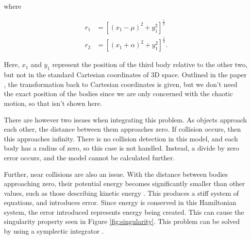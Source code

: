 \documentclass{article}
\begin{document}
where 

\begin{align}
    r_1 &= \left[(x_1 - \mu)^2 + y_1^2\right]^{\frac{1}{2}} \nonumber \\
    r_2 &= \left[(x_1 + \alpha)^2 + y_1^2\right]^{\frac{1}{2}}.
\end{align}

Here, $x_1$ and $y_1$ represent the position of the third body relative to the other two,
but not in the standard 
Cartesian coordinates of 3D space. Outlined in the paper \cite{eberle2007case}, the 
transformation back to Cartesian coordinates is given, but we don't need the exact 
position of the bodies since we are only concerned with the chaotic motion, so that isn't 
shown here.

There are however two issues when integrating this problem. As objects approach each
other, the distance between them 
approaches zero. If collision occurs, then this approaches infinity. There is no 
collision detection in this model, and each body has a radius of zero,
so this case is not handled. Instead, a divide by zero error occurs,
and the model cannot be calculated further.

Further, near collisions 
are also an issue. With the distance between bodies 
approaching zero, their potential energy becomes significantly smaller than other values, 
such as those describing kinetic energy \cite{chambers1999hybrid}. This 
produces a stiff system of equations, and introduces error. Since energy is conserved in
this Hamiltonian system, the error introduced represents energy being 
created. This can cause the singularity property seen in Figure \ref{fig:singularity}.
This problem can be solved by using a symplectic integrator \cite{chambers1999hybrid}. 
\end{document}
